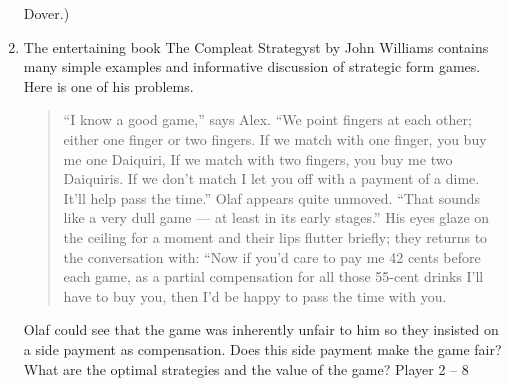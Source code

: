 \begin{enumerate}
Dover.)
\item  The entertaining book The Compleat Strategyst by John Williams contains many
simple examples and informative discussion of strategic form games. Here is one of his
problems.
\begin{quote}
“I know a good game,” says Alex. “We point fingers at each other; either
one finger or two fingers. If we match with one finger, you buy me one Daiquiri,
If we match with two fingers, you buy me two Daiquiris. If we don’t match I let
you off with a payment of a dime. It’ll help pass the time.”
Olaf appears quite unmoved. “That sounds like a very dull game — at least
in its early stages.” His eyes glaze on the ceiling for a moment and their lips flutter
briefly; they returns to the conversation with: “Now if you’d care to pay me 42
cents before each game, as a partial compensation for all those 55-cent drinks I’ll
have to buy you, then I’d be happy to pass the time with you.
\end{quote}
Olaf could see that the game was inherently unfair to him so they insisted on a side
payment as compensation. Does this side payment make the game fair? What are the
optimal strategies and the value of the game?
Player 2 – 8
\end{enumerate}

